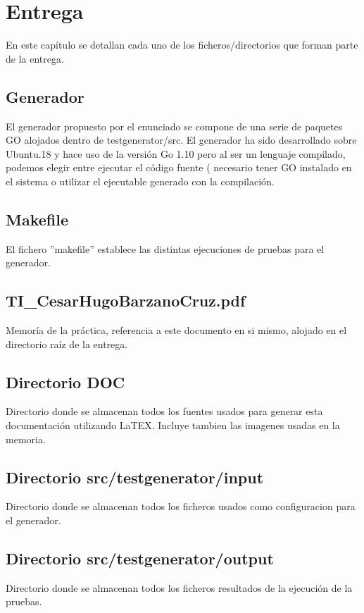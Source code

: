 \documentclass[a4paper,11pt]{book}
\begin{document}
\chapter{Entrega}
En este capítulo se detallan cada uno de los ficheros/directorios que forman parte de la entrega. 

\section{Generador}
El generador propuesto por el enunciado se compone de una serie de paquetes GO alojados dentro de testgenerator/src. El generador ha sido desarrollado sobre Ubuntu.18 y hace uso de la versión Go 1.10 pero al ser un lenguaje compilado, podemos elegir entre ejecutar el código fuente ( necesario tener GO instalado en el sistema o utilizar el ejecutable generado con la compilación.  

\section{Makefile}
El fichero ''makefile'' establece las distintas ejecuciones de pruebas para el generador.
 

\section{TI\_CesarHugoBarzanoCruz.pdf}
Memoría de la práctica, referencia a este documento en si mismo, alojado en el directorio raíz de la entrega. 

\section{Directorio DOC}
Directorio donde se almacenan todos los fuentes usados para generar esta documentación utilizando LaTEX. Incluye tambien las imagenes usadas en la memoria. 

\section{Directorio src/testgenerator/input}
Directorio donde se almacenan todos los ficheros usados como configuracion para el generador.

\section{Directorio src/testgenerator/output}
Directorio donde se almacenan todos los ficheros resultados de la ejecución de la pruebas. 
\end{document}
